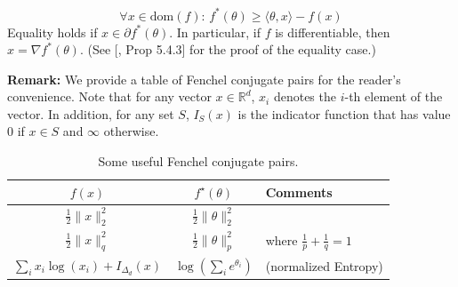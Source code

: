 \begin{define}
    \begin{equation}\label{eqn:fenchel_young_ineq}
        \forall x \in \text{dom}(f): \, f^*(\theta) \geq \langle \theta, x\rangle - f(x)
    \end{equation}
    Equality holds if $x \in \partial f^*(\theta)$. In particular, if $f$ is differentiable, then $x = \nabla f ^*(\theta)$. (See [\cite{bertsekas2009convex}, Prop 5.4.3] for the proof of the equality case.)
\end{define}

\noindent \textbf{Remark:} We provide a table of Fenchel conjugate pairs for the reader's convenience. Note that for any vector $x \in \mathbb{R}^d$, $x_i$ denotes the $i$-th element of the vector. In addition, for any set $S$, $I_S(x)$ is the indicator function that has value $0$ if $x \in S$ and $\infty$ otherwise.

\begin{table}[h]
\centering
\renewcommand{\arraystretch}{1.3}
\begin{tabular}{ccl}
\toprule
$f(x)$ & $f^\star(\theta)$ & Comments \\
\midrule
$\frac{1}{2}\|x\|_2^2$ & $\frac{1}{2}\|\theta\|_2^2$ & \\
$\frac{1}{2}\|x\|_q^2$ & $\frac{1}{2}\|\theta\|_p^2$ & where $\frac{1}{p} + \frac{1}{q} = 1$ \\
$\sum_i x_i\log(x_i) + I_{\Delta_d}(x)$ & $\log\left(\sum_i e^{\theta_i}\right)$ & (normalized Entropy) \\
\bottomrule
\end{tabular}
\caption{Some useful Fenchel conjugate pairs.}
\label{tab:fenchel-pairs}
\end{table}

